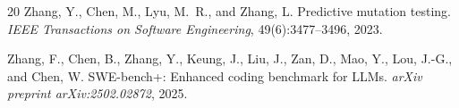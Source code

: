 \documentclass[11pt]{article}
\begin{document}
\begin{thebibliography}{20}
Zhang, Y., Chen, M., Lyu, M.~R., and Zhang, L.
\newblock Predictive mutation testing.
\newblock \emph{IEEE Transactions on Software Engineering}, 49(6):3477--3496, 2023.

Zhang, F., Chen, B., Zhang, Y., Keung, J., Liu, J., Zan, D., Mao, Y., Lou, J.-G., and Chen, W.
\newblock SWE-bench+: Enhanced coding benchmark for LLMs.
\newblock \emph{arXiv preprint arXiv:2502.02872}, 2025.

\end{thebibliography}
\end{document}
